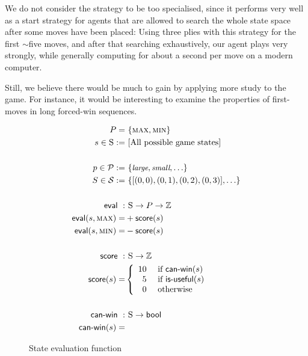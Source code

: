 \documentclass[a4paper,9pt]{article}
\begin{document}
We do not consider the strategy to be too specialised, since it performs very
well as a start strategy for agents that are allowed to search the whole state
space after some moves have been placed: Using three plies with this strategy
for the first $\sim$five moves, and after that searching exhaustively, our
agent plays very strongly, while generally computing for about a second per
move on a modern computer. 

Still, we believe there would be much to gain by applying more study to the
game. For instance, it would be interesting to examine the properties of
first-moves in long forced-win sequences. 

\begin{figure}[h!]
\caption{State evaluation function}
\vspace{-19pt}
\label{fig:evalfn}
\begin{framed}
\vspace{-10pt}
{ 
\begin{align*}
  P =&~\{ \textsc{max}, \textsc{min} \} \\
  s \in \textsc{S} :=&~[\text{All possible game states}] \\
  \\
  p \in \mathcal{P} :=&~\{ { \small \emph{large}, \emph{small}, \ldots \} } \\
  S \in \mathcal{S} :=&~\{ 
    { \footnotesize [(0, 0), (0, 1), (0, 2), (0, 3)], \ldots } \} \\
  \\
  \textsf{eval}~:&~\textsc{S} \rightarrow P \rightarrow \mathbb{Z} \\
  \textsf{eval}(s, \textsc{max}) =& +\textsf{score}(s) \\
  \textsf{eval}(s, \textsc{min}) =& -\textsf{score}(s) \\
  \\
  \textsf{score}~:&~\textsc{S} \rightarrow \mathbb{Z} \\
  \textsf{score}(s) =& \left\{ 
    \begin{array}{rl}
      10 &\mbox{ if $\textsf{can-win}(s)$ } \\
       5 &\mbox{ if $\textsf{is-useful}(s)$ }\\
       0 &\mbox{ otherwise} \\
    \end{array} \right. \\
  \\
  \textsf{can-win}~:&~\textsc{S} \rightarrow \textsf{bool} \\
  \textsf{can-win}(s) =&~

\end{align*}}
\end{framed}
\end{figure}
\end{document}
